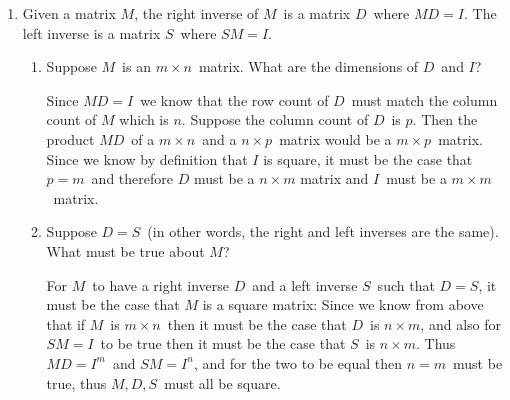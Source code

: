 \documentclass{letter}
\newcommand{\?}{\stackrel{?}{=}}
\newcommand\Que[1]{%
   \leavevmode\noindent
   #1
}
\newcommand\Ans[2][]{%
   \leavevmode\noindent
   {
       \begin{mdframed}[backgroundcolor=blue!10]
       #2
       \end{mdframed}
   }
}
\newenvironment{salign}
 {\par$\!\aligned}
 {\endaligned$\par}
\newenvironment{Mat}[1]{%
  \left[\begin{array}{*{#1}{r}}
}{%
  \end{array}\right]
}
\begin{document}
\begin{enumerate}
    \newpage
    \item 
        Given a matrix $M$, the right inverse of $M$\ is a matrix $D$\ where $MD=I$.  The left inverse is a matrix $S$\ where $SM=I$. 
    \begin{enumerate}[label=(\alph*)]
    \item \Que{
        Suppose $M$\ is an $m\times n$\ matrix.  What are the dimensions of $D$\ and $I$?
    }
    \Ans{
       Since $MD=I$\ we know that the row count of $D$\ must match the column count of $M$ which is $n$.  Suppose the column count of $D$\ is $p$.  Then the product $MD$\ of a $m\times n$\ and a $n\times p$\ matrix would be a $m\times p$\ matrix.  Since we know by definition that $I$ is square, it must be the case that $p=m$\ and therefore $D$ must be a $n\times m$ matrix and $I$\ must be a $m\times m$\ matrix. 
    }
    \item \Que{
        Suppose $D=S$\ (in other words, the right and left inverses are the same).  What must be true about $M$?  
    }
    \Ans{
      For $M$\ to have a right inverse $D$\ and a left inverse $S$\ such that $D=S$, it must be the case that $M$ is a square matrix: Since we know from above that if $M$\ is $m\times n$\ then it must be the case that $D$\ is $n\times m$, and also for $SM=I$\ to be true then it must be the case that $S$\ is $n\times m$.  Thus $MD=I^m$\ and $SM=I^n$, and for the two to be equal then $n=m$\ must be true, thus $M, D, S$\ must all be square.
}
\end{enumerate}
\end{enumerate}
\end{document}
